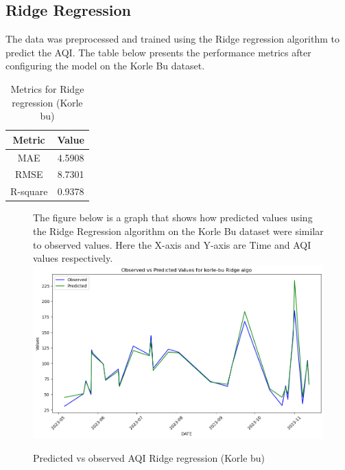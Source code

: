 \documentclass{book}
\numberwithin{equation}{section}
\numberwithin{figure}{section}
\begin{document}
\subsection{Ridge Regression}
The data was preprocessed and trained using the Ridge regression algorithm to predict the AQI. The table below presents the performance metrics after configuring the model on the Korle Bu dataset.
\begin{table}[H]
    \centering
    \begin{tabular}{|c|c|}
        \hline
        \textbf{Metric} & \textbf{Value} \\
        \hline
        MAE & 4.5908 \\
        \hline
        RMSE & 8.7301\\
        \hline
        R-square & 0.9378 \\
        \hline
    \end{tabular}
    \caption{Metrics for Ridge regression (Korle bu)}
    \label{tab: Ridge metrics(Korle Bu)}
\end{table}
\begin{figure}[H]
 \begin{minipage}{\linewidth}
        The figure below is a graph that shows how predicted values using the Ridge Regression algorithm on the Korle Bu dataset were similar to observed values. Here the X-axis and Y-axis are Time and AQI values respectively.
        \vspace{0.5em} 
        \includegraphics[width=\linewidth]{korle bu ridge.png}
       
        \caption{ Predicted vs observed AQI Ridge regression (Korle bu)}
        \label{fig: Ridge Predicted vs observed AQI(Korle Bu)}
    \end{minipage}
\end{figure}
\end{document}
